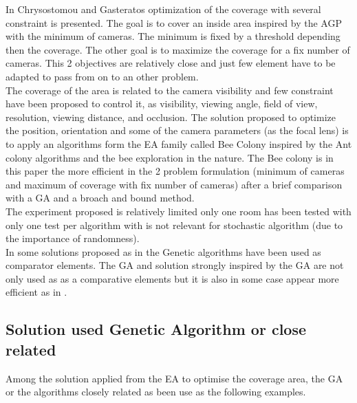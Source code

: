  In Chrysostomou and Gasteratos \cite{82*chrysostomou2012} optimization of the coverage with several constraint is presented.  The goal is to cover an inside area inspired by the AGP with the minimum of cameras. The minimum is fixed by a threshold depending then the coverage. The other goal is to maximize the coverage for a fix number of cameras. This 2 objectives are relatively close and just few element have to be adapted to pass from on to an other problem.\\
The coverage of the area is related to the camera visibility and few constraint have been proposed to control it, as visibility, viewing angle, field of view, resolution, viewing distance, and occlusion. The solution proposed to optimize the position, orientation and some of the camera parameters (as the focal lens) is to apply an algorithms form the EA family called Bee Colony inspired by the Ant colony algorithms and the bee exploration in the nature. The Bee colony is in this paper the more efficient in the 2 problem formulation (minimum of cameras and maximum of coverage with fix number of cameras) after a brief comparison with a GA and a broach and bound method. \\
The experiment proposed is relatively limited only one room has been tested with only one test per algorithm with is not relevant for stochastic algorithm (due to the importance of randomness).  \\

In some solutions proposed as in \cite{82*chrysostomou2012,33*reddy2012,141*akbarzadeh2013} the Genetic algorithms have been used as comparator elements. The GA and solution strongly inspired by the GA  are not only used as as a comparative elements but it is also in some case appear more efficient as in \cite{83*van2009,101*topcuoglu2009,165*jiang2010,152*wang2009}.

\subsection{Solution used Genetic Algorithm or close related}

 Among the solution applied from the EA to optimise the coverage area, the GA or the algorithms closely related as been use as the following examples. \\

